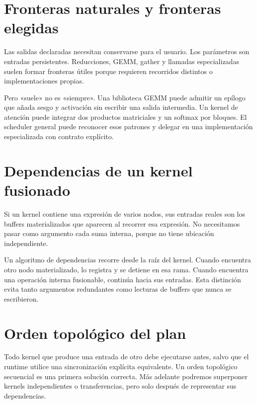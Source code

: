 \documentclass[12pt,a4paper,oneside]{report}
\begin{document}
\section{Fronteras naturales y fronteras elegidas}
Las salidas declaradas necesitan conservarse para el usuario. Los parámetros son entradas persistentes. Reducciones, GEMM, gather y llamadas especializadas suelen formar fronteras útiles porque requieren recorridos distintos o implementaciones propias.

Pero «suele» no es «siempre». Una biblioteca GEMM puede admitir un epílogo que añada sesgo y activación sin escribir una salida intermedia. Un kernel de atención puede integrar dos productos matriciales y un softmax por bloques. El scheduler general puede reconocer esos patrones y delegar en una implementación especializada con contrato explícito.

\section{Dependencias de un kernel fusionado}
Si un kernel contiene una expresión de varios nodos, sus entradas reales son los buffers materializados que aparecen al recorrer esa expresión. No necesitamos pasar como argumento cada suma interna, porque no tiene ubicación independiente.

Un algoritmo de dependencias recorre desde la raíz del kernel. Cuando encuentra otro nodo materializado, lo registra y se detiene en esa rama. Cuando encuentra una operación interna fusionable, continúa hacia sus entradas. Esta distinción evita tanto argumentos redundantes como lecturas de buffers que nunca se escribieron.

\begin{center}
\end{center}
\section{Orden topológico del plan}
Todo kernel que produce una entrada de otro debe ejecutarse antes, salvo que el runtime utilice una sincronización explícita equivalente. Un orden topológico secuencial es una primera solución correcta. Más adelante podremos superponer kernels independientes o transferencias, pero solo después de representar sus dependencias.
\end{document}

